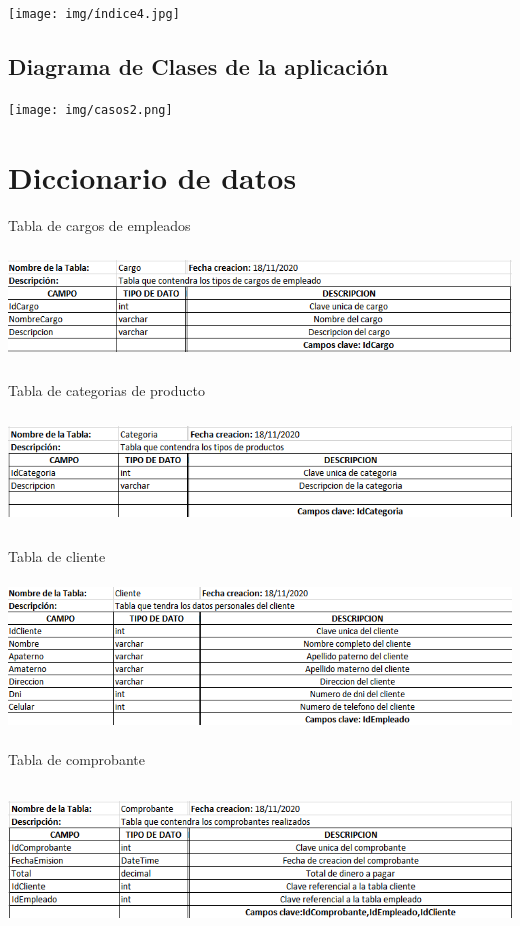 \documentclass[12pt,letterpaper]{article}
\begin{document}
\begin{center}
    \texttt{[image: img/índice4.jpg]}  
\end{center}

\subsection{Diagrama de Clases de la aplicación}

\begin{center}
    \texttt{[image: img/casos2.png]}  
\end{center}

\section{Diccionario de datos}

Tabla de cargos de empleados
\begin{center}
    \includegraphics[width=14cm, height=3cm]{img/cargo.png}  
\end{center}
Tabla de categorias de producto
\begin{center}
    \includegraphics[width=14cm, height=3cm]{img/categoria.png}  
\end{center}
\newpage
Tabla de cliente
\begin{center}
    \includegraphics[width=14cm, height=4cm]{img/cliente.png}  
\end{center}
Tabla de comprobante
\begin{center}
    \includegraphics[width=14cm, height=4cm]{img/comprobante.png}  
\end{center}
\end{document}

